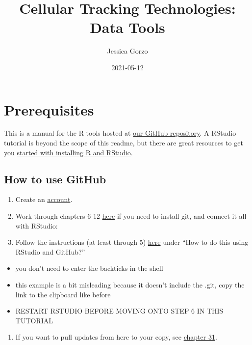 \documentclass[
]{book}
\title{Cellular Tracking Technologies: Data Tools}
\author{Jessica Gorzo}
\date{2021-05-12}
\providecommand{\tightlist}{%
  \setlength{\itemsep}{0pt}\setlength{\parskip}{0pt}}
\begin{document}
\maketitle

{
\setcounter{tocdepth}{1}
\tableofcontents
}
\hypertarget{prerequisites}{%
\chapter*{Prerequisites}\label{prerequisites}}

This is a manual for the R tools hosted at \href{https://github.com/cellular-tracking-technologies/data_tools}{our GitHub repository}. A RStudio tutorial is beyond the scope of this readme, but there are great resources to get you \href{https://www.earthdatascience.org/courses/earth-analytics/document-your-science/setup-r-rstudio/}{started with installing R and RStudio}.

\hypertarget{how-to-use-github}{%
\section*{How to use GitHub}\label{how-to-use-github}}

\begin{enumerate}
\def\labelenumi{\arabic{enumi}.}
\tightlist
\item
  Create an \href{https://github.com}{account}.
\item
  Work through chapters 6-12 \href{https://happygitwithr.com/install-git.html}{here} if you need to install git, and connect it all with RStudio:
\item
  Follow the instructions (at least through 5) \href{https://r-bio.github.io/intro-git-rstudio/}{here} under ``How to do this using RStudio and GitHub?''
\end{enumerate}

\begin{itemize}
\tightlist
\item
  you don't need to enter the backticks in the shell
\item
  this example is a bit misleading because it doesn't include the .git, copy the link to the clipboard like before
\item
  RESTART RSTUDIO BEFORE MOVING ONTO STEP 6 IN THIS TUTORIAL
\end{itemize}

\begin{enumerate}
\def\labelenumi{\arabic{enumi}.}
\setcounter{enumi}{3}
\tightlist
\item
  If you want to pull updates from here to your copy, see \href{https://happygitwithr.com/upstream-changes.html\#pull-changes-from-upstream}{chapter 31}.
\end{enumerate}
\end{document}
